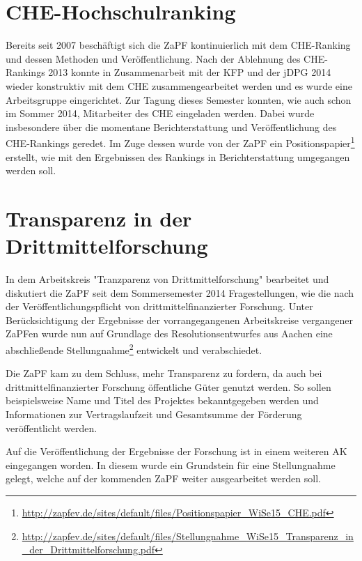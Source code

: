 \section*{CHE-Hochschulranking}
Bereits seit 2007 beschäftigt sich die ZaPF kontinuierlich mit dem CHE-Ranking und dessen Methoden und Veröffentlichung. Nach der Ablehnung des CHE-Rankings 2013 konnte in Zusammenarbeit mit der KFP und der jDPG 2014 wieder konstruktiv mit dem CHE zusammengearbeitet werden und es wurde eine Arbeitsgruppe eingerichtet. Zur Tagung dieses Semester konnten, wie auch schon im Sommer 2014, Mitarbeiter des CHE eingeladen werden. Dabei wurde insbesondere über die momentane Berichterstattung und Veröffentlichung des CHE-Rankings geredet. Im Zuge dessen wurde von der ZaPF ein Positionspapier\footnote{\href{http://zapfev.de/sites/default/files/Positionspapier\_WiSe15\_CHE.pdf}{\url{http://zapfev.de/sites/default/files/Positionspapier\_WiSe15\_CHE.pdf}}} erstellt, wie mit den Ergebnissen des Rankings in Berichterstattung umgegangen werden soll.

\section*{Transparenz in der Drittmittelforschung}
In dem Arbeitskreis "Tranzparenz von Drittmittelforschung" bearbeitet und diskutiert die ZaPF seit dem Sommersemester 2014 Fragestellungen, wie die nach der Veröffentlichungspflicht von drittmittelfinanzierter Forschung. Unter Berücksichtigung der Ergebnisse der vorrangegangenen Arbeitskreise vergangener ZaPFen wurde nun auf Grundlage des Resolutionsentwurfes aus Aachen eine abschließende Stellungnahme\footnote{\href{http://zapfev.de/sites/default/files/Stellungnahme\_WiSe15\_Transparenz\_in\_der\_Drittmittelforschung.pdf}{\url{http://zapfev.de/sites/default/files/Stellungnahme\_WiSe15\_Transparenz\_in\_der\_Drittmittelforschung.pdf}}} entwickelt und verabschiedet.

Die ZaPF kam zu dem Schluss, mehr Transparenz zu fordern, da auch bei drittmittelfinanzierter Forschung öffentliche Güter genutzt werden. So sollen beispielsweise Name und Titel des Projektes bekanntgegeben werden und Informationen zur Vertragslaufzeit und Gesamtsumme der Förderung veröffentlicht werden.

Auf die Veröffentlichung der Ergebnisse der Forschung ist in einem weiteren AK eingegangen worden. In diesem wurde ein Grundstein für eine Stellungnahme gelegt, welche auf der kommenden ZaPF weiter ausgearbeitet werden soll.

